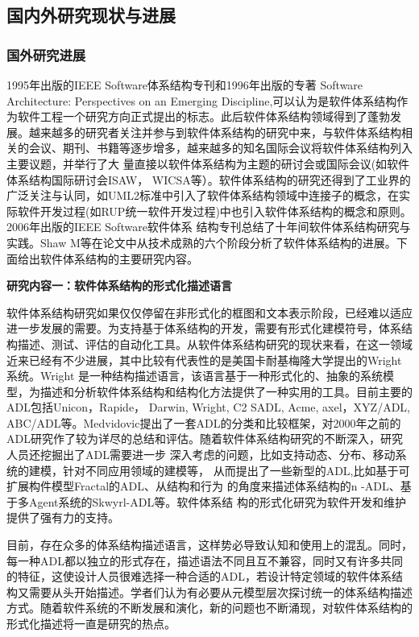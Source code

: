 \documentclass[article]{BJTU-thesis}
\begin{document}
	\subsection{国内外研究现状与进展}
	\subsubsection{国外研究进展}
	1995年出版的IEEE Software体系结构专刊\cite{Garlan1995Introduction}和1996年出版的专著\cite{ShawSoftware} Software Architecture: Perspectives on an Emerging Discipline,可以认为是软件体系结构作为软件工程一个研究方向正式提出的标志。此后软件体系结构领域得到了蓬勃发展。越来越多的研究者关注并参与到软件体系结构的研究中来，与软件体系结构相关的会议、期刊、书籍等逐步增多，越来越多的知名国际会议将软件体系结构列入主要议题，并举行了大 量直接以软件体系结构为主题的研讨会或国际会议(如软件体系结构国际研讨会ISAW， WICSA等）。软件体系结构的研究还得到了工业界的广泛关注与认同，如UML2标准中引入了软件体系结构领域中连接子的概念\cite{Allen1994Formalizing}，在实际软件开发过程(如RUP统一软件开发过程\cite{Ivar1999Unified})中也引入软件体系结构的概念和原则。2006年出版的IEEE Software软件体系 结构专刊\cite{Kruchten2006The}总结了十年间软件体系结构研究与实践。Shaw M等在论文中\cite{ShawThe}从技术成熟的六个阶段分析了软件体系结构的进展。下面给出软件体系结构的主要研究内容。
	\newline

	\noindent\textbf{研究内容一：软件体系结构的形式化描述语言}
	
	软件体系结构研究如果仅仅停留在非形式化的框图和文本表示阶段，已经难以适应进一步发展的需要。为支持基于体系结构的开发，需要有形式化建模符号，体系结构描述、测试、评估的自动化工具。从软件体系结构研究的现状来看，在这一领域近来已经有不少进展，其中比较有代表性的是美国卡耐基梅隆大学提出的Wright系统。Wright 是一种结构描述语言，该语言基于一种形式化的、抽象的系统模型，为描述和分析软件体系结构和结构化方法提供了一种实用的工具。目前主要的ADL包括Unicon，Rapide， Darwin, Wright, C2 SADL, Acme, axel\cite{DashofyA}，XYZ/ADL, ABC/ADL\cite{Mei2002ABC}等。Medvidovic提出了一套ADL的分类和比较框架，对2000年之前的ADL研究作了较为详尽的总结和评估\cite{Medvidovic2000A}。随着软件体系结构研究的不断深入，研究人员还挖掘出了ADL需要进一步 深入考虑的问题，比如支持动态、分布、移动系统的建模，针对不同应用领域的建模等， 从而提出了一些新型的ADL,比如基于可扩展构件模型Fractal的ADL、从结构和行为 的角度来描述体系结构的n -ADL\cite{Oquendo2004}、基于多Agent系统的Skwyrl-ADL等。软件体系结 构的形式化研究为软件开发和维护提供了强有力的支持。
	
	目前，存在众多的体系结构描述语言，这样势必导致认知和使用上的混乱。同时，每一种ADL都以独立的形式存在，描述语法不同且互不兼容，同时又有许多共同的特征，这使设计人员很难选择一种合适的ADL，若设计特定领域的软件体系结构又需要从头开始描述。学者们认为有必要从元模型层次探讨统一的体系结构描述方式。随着软件系统的不断发展和演化，新的问题也不断涌现，对软件体系结构的形式化描述将一直是研究的热点。
	\newline
	
\end{document}
